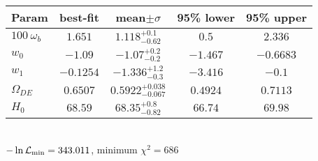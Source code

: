 \begin{tabular}{|l|c|c|c|c|} 
 \hline 
Param & best-fit & mean$\pm\sigma$ & 95\% lower & 95\% upper \\ \hline 
$100~\omega_{b }$ &$1.651$ & $1.118_{-0.62}^{+0.1}$ & $0.5$ & $2.336$ \\ 
$w_{0 }$ &$-1.09$ & $-1.07_{-0.2}^{+0.2}$ & $-1.467$ & $-0.6683$ \\ 
$w_{1 }$ &$-0.1254$ & $-1.336_{-0.3}^{+1.2}$ & $-3.416$ & $-0.1$ \\ 
$\Omega_{DE}$ &$0.6507$ & $0.5922_{-0.067}^{+0.038}$ & $0.4924$ & $0.7113$ \\ 
$H_{0 }$ &$68.59$ & $68.35_{-0.82}^{+0.8}$ & $66.74$ & $69.98$ \\ 
\hline 
 \end{tabular} \\ 
$-\ln{\cal L}_\mathrm{min} =343.011$, minimum $\chi^2=686$ \\ 
